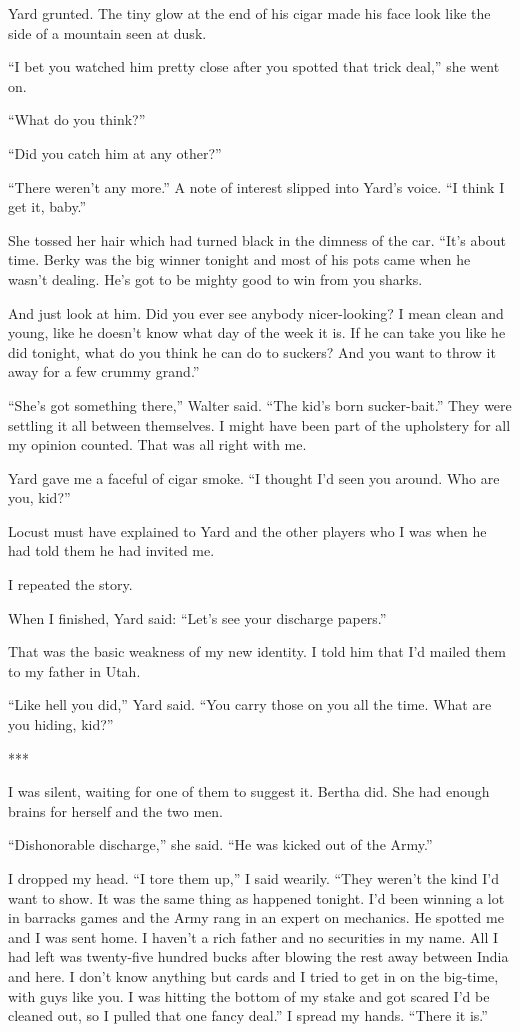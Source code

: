\documentclass{novel}
\begin{document}
{Yard grunted. The tiny glow at the end of his cigar made his face look like the side of a mountain seen at dusk.

“I bet you watched him pretty close after you spotted that trick deal,” she went on.

“What do you think?”

“Did you catch him at any other?”

“There weren’t any more.” A note of interest slipped into Yard’s voice. “I think I get it, baby.”

She tossed her hair which had turned black in the dimness of the car. “It’s about time. Berky was the big winner tonight and most of his pots came when he wasn’t dealing. He’s got to be mighty good to win from you sharks.

And just look at him. Did you ever see anybody nicer-looking? I mean clean and young, like he doesn’t know what day of the week it is. If he can take you like he did tonight, what do you think he can do to suckers? And you want to throw it away for a few crummy grand.”

“She’s got something there,” Walter said. “The kid’s born sucker-bait.” They were settling it all between themselves. I might have been part of the upholstery for all my opinion counted. That was all right with me.

Yard gave me a faceful of cigar smoke. “I thought I’d seen you around. Who are you, kid?”

Locust must have explained to Yard and the other players who I was when he had told them he had invited me.

I repeated the story.

When I finished, Yard said: “Let’s see your discharge papers.”

That was the basic weakness of my new identity. I told him that I’d mailed them to my father in Utah.

“Like hell you did,” Yard said. “You carry those on you all the time. What are you hiding, kid?”

***

I was silent, waiting for one of them to suggest it. Bertha did. She had enough brains for herself and the two men.

“Dishonorable discharge,” she said. “He was kicked out of the Army.”

I dropped my head. “I tore them up,” I said wearily. “They weren’t the kind I’d want to show. It was the same thing as happened tonight. I’d been winning a lot in barracks games and the Army rang in an expert on mechanics. He spotted me and I was sent home. I haven’t a rich father and no securities in my name. All I had left was twenty-five hundred bucks after blowing the rest away between India and here. I don’t know anything but cards and I tried to get in on the big-time, with guys like you. I was hitting the bottom of my stake and got scared I’d be cleaned out, so I pulled that one fancy deal.” I spread my hands. “There it is.”

}
\end{document}
